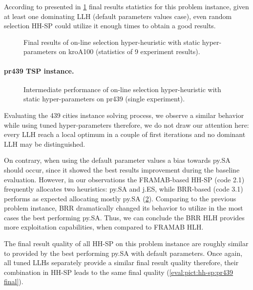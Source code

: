 According to presented in \cref{eval:pict:hh-sp:kroA100 final} final results statistics for this problem instance, given at least one dominating LLH (default parameters values case), even random selection HH-SP could utilize it enough times to obtain a good results.

\begin{figure}[b]
	\centering
	\vspace{-20pt}
	
	\caption{Final results of on-line selection hyper-heuristic with static hyper-parameters on kroA100 (statistics of 9 experiment results).}
	\vspace{-5pt}
	\label{eval:pict:hh-sp:kroA100 final}
\end{figure}

\newpage
\paragraph{pr439 TSP instance.}
\begin{figure}[t]
	\centering
	\vspace{-20pt}
	
	\caption{Intermediate performance of on-line selection hyper-heuristic with static hyper-parameters on pr439 (single experiment).}
	\vspace{-10pt}
	\label{eval:pict:hh-sp:pr439 intermediate}
\end{figure}
Evaluating the 439 cities instance solving process, we observe a similar behavior while using tuned hyper-parameters therefore, we do not draw our attention here: every LLH reach a local optimum in a couple of first iterations and no dominant LLH may be distinguished.

On contrary, when using the default parameter values a bias towards py.SA should occur, since it showed the best results improvement during the baseline evaluation. However, in our observations the FRAMAB-based HH-SP (code 2.1) frequently allocates two heuristics: py.SA and j.ES, while BRR-based (code 3.1) performs as expected allocating mostly py.SA (\cref{eval:pict:hh-sp:pr439 intermediate}). Comparing to the previous problem instance, BRR dramatically changed its behavior to utilize in the most cases the best performing py.SA. Thus, we can conclude the BRR HLH provides more exploitation capabilities, when compared to FRAMAB HLH.

The final result quality of all HH-SP on this problem instance are roughly similar to provided by the best performing py.SA with default parameters. Once again, all tuned LLHs separately provide a similar final result quality therefore, their combination in HH-SP leads to the same final quality (\cref{eval:pict:hh-sp:pr439 final}).

